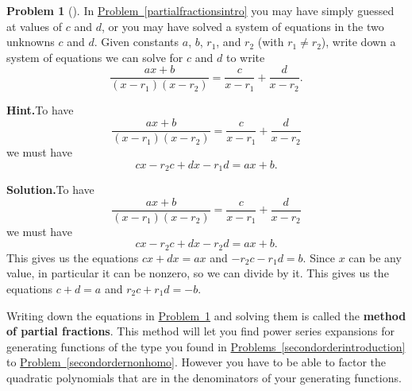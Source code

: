 \documentclass[10pt,]{book}
\newcommand{\terminology}[1]{\textbf{#1}}
\theoremstyle{plain}
\theoremstyle{definition}
\newtheorem{activity}[project]{Problem}
\theoremstyle{definition}
\numberwithin{equation}{chapter}
\begin{document}
\begin{activity}[]\label{partialfractions1}
In \hyperref[partialfractionsintro]{Problem~\ref{partialfractionsintro}} you may have simply guessed at values of \(c\) and \(d\), or you may have solved a system of equations in the two unknowns \(c\) and \(d\). Given constants \(a\), \(b\), \(r_1\), and \(r_2\) (with \(r_1\not= r_2\)), write down a system of equations we can solve for \(c\) and \(d\) to write%
\begin{equation*}
\frac{ax+b}{(x-r_1)(x-r_2)} = \frac{c}{x-r_1} + \frac{d}{x-r_2}\text{.}
\end{equation*}
%
\par\medskip\noindent%
\textbf{Hint.}\quad To have%
\begin{equation*}
\frac{ax+b}{(x-r_1)(x-r_2)} = \frac{c}{x-r_1} + \frac{d}{x-r_2}
\end{equation*}
we must have%
\begin{equation*}
cx-r_2c+dx-r_1d =ax+b\text{.}
\end{equation*}
%
\par\medskip\noindent%
\textbf{Solution.}\quad To have%
\begin{equation*}
\frac{ax+b}{(x-r_1)(x-r_2)} =  \frac{c}{x-r_1} + \frac{d}{x-r_2}
\end{equation*}
we must have%
\begin{equation*}
cx-r_2c+dx-r_2d = ax+b.
\end{equation*}
This gives us the equations \(cx+dx=ax\) and \(-r_2c-r_1d=b\). Since \(x\) can be any value, in particular it can be nonzero, so we can divide by it. This gives us the equations \(c+d=a\) and \(r_2c+r_1d=-b\).%
\end{activity}
Writing down the equations in \hyperref[partialfractions1]{Problem~\ref{partialfractions1}} and solving them is called the \terminology{method of partial fractions}. This method will let you find power series expansions for generating functions of the type you found in \hyperref[secondorderintroduction]{Problems~\ref{secondorderintroduction}} to \hyperref[secondordernonhomo]{Problem~\ref{secondordernonhomo}}. However you have to be able to factor the quadratic polynomials that are in the denominators of your generating functions.%
\end{document}
